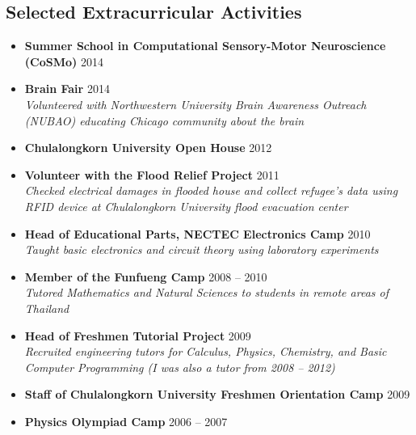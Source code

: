 \documentclass[margin,line]{res}
\begin{document}
\begin{resume}


\section{\sc Selected Extracurricular Activities}

\begin{itemize}[leftmargin=0cm, label={}]
\item {\bf Summer School in Computational Sensory-Motor Neuroscience (CoSMo)} 	\hfill 2014

\item{\bf Brain Fair}														\hfill 2014\\
{\em Volunteered with Northwestern University Brain Awareness Outreach (NUBAO) educating Chicago community about the brain}

\item {\bf Chulalongkorn University Open House}								\hfill 2012

\item
{\bf Volunteer with the Flood Relief Project}									\hfill 2011 \\
{\em Checked electrical damages in flooded house and collect refugee's data using RFID device at Chulalongkorn University flood evacuation center}

\item {\bf Head of Educational Parts, NECTEC Electronics Camp}					\hfill 2010 \\
{\em Taught basic electronics and circuit theory using laboratory experiments}

\item {\bf Member of the Funfueng Camp}										\hfill 2008 -- 2010 \\
{\em Tutored Mathematics and Natural Sciences to students in remote areas of Thailand}

\item {\bf Head of Freshmen Tutorial Project }									\hfill 2009 \\
{\em Recruited engineering tutors for Calculus, Physics, Chemistry, and Basic Computer Programming (I was also a tutor from 2008 -- 2012)}

\item {\bf Staff of Chulalongkorn University Freshmen Orientation Camp}				\hfill 2009

\item {\bf Physics Olympiad Camp}											\hfill 2006 -- 2007


\end{itemize}
\end{resume}
\end{document}
